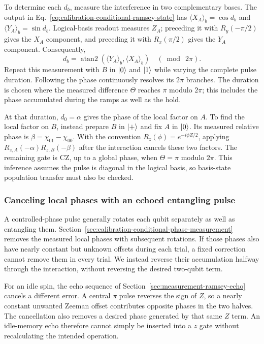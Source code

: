 To determine each $d_b$, measure the interference in two complementary
bases. The output in Eq.~\eqref{eq:calibration-conditional-ramsey-state}
has $\langle X_A\rangle_b=\cos d_b$ and
$\langle Y_A\rangle_b=\sin d_b$. Logical-basis readout measures
$Z_A$; preceding it with $R_y(-\pi/2)$ gives the $X_A$ component,
and preceding it with $R_x(\pi/2)$ gives the $Y_A$ component.
Consequently,
\[
 d_b=\operatorname{atan2}\!\left(
   \langle Y_A\rangle_b,\langle X_A\rangle_b\right)
 \quad (\bmod\ 2\pi).
\]
Repeat this measurement with $B$ in $\lvert 0\rangle$ and $\lvert 1\rangle$ while
varying the complete pulse duration. Following the phase continuously
resolves its $2\pi$ branches. The duration is chosen where the
measured difference $\Theta$ reaches $\pi$ modulo $2\pi$; this
includes the phase accumulated during the ramps as well as the hold.

At that duration, $d_0=\alpha$ gives the phase of the local factor
on $A$. To find the local factor on $B$, instead prepare $B$ in
$\lvert +\rangle$ and fix $A$ in $\lvert 0\rangle$. Its measured relative phase is
$\beta=\chi_{01}-\chi_{00}$. With the convention
$R_z(\phi)=e^{-i\phi Z/2}$, applying
$R_{z,A}(-\alpha)R_{z,B}(-\beta)$ after the interaction cancels
these two factors. The remaining gate is CZ, up to a global phase,
when $\Theta=\pi$ modulo $2\pi$. This inference assumes the pulse
is diagonal in the logical basis, so basis-state population transfer
must also be checked.

\subsubsection{Canceling local phases with an echoed entangling pulse}
\label{sec:calibration-echo-control}

A controlled-phase pulse generally rotates each qubit separately as
well as entangling them.
Section~\ref{sec:calibration-conditional-phase-measurement}
removes the measured local phases with subsequent rotations.
If those phases also have nearly constant but unknown offsets during
each trial, a fixed correction cannot remove them in every trial.
We instead reverse their accumulation halfway through the interaction,
without reversing the desired two-qubit term.

For an idle spin, the echo sequence of
Section~\ref{sec:measurement-ramsey-echo} cancels a different error.
A central $\pi$ pulse reverses the sign of $Z$, so a nearly constant
unwanted Zeeman offset contributes opposite phases in the two
halves. The cancellation also removes a desired phase generated
by that same $Z$ term. An idle-memory echo therefore cannot simply
be inserted into a $z$ gate without recalculating the intended
operation.


